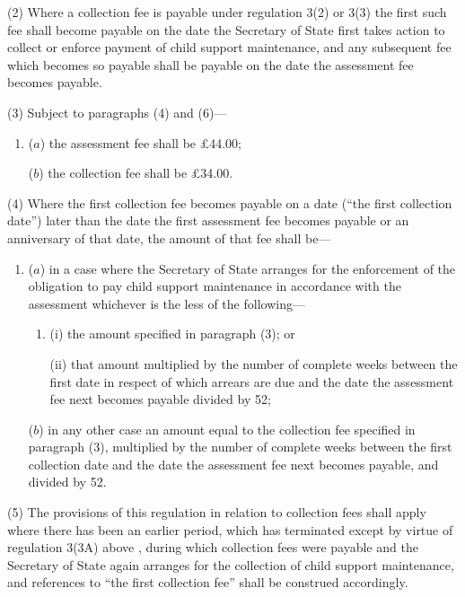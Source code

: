 \documentclass[12pt,a4paper]{article}
\begin{document}
(2) Where a collection fee is payable under regulation 3(2) or 3(3) the first such fee shall become payable on the date the Secretary of State first takes action to collect or enforce payment of child support maintenance, and any subsequent fee which becomes so payable shall be payable on the date the assessment fee becomes payable.

(3) Subject to paragraphs (4) and (6)—
\begin{enumerate}\item[]
($a$) the assessment fee shall be £44.00;

($b$) the collection fee shall be £34.00.
\end{enumerate}

(4) Where the first collection fee becomes payable on a date (“the first collection date”) later than the date the first assessment fee becomes payable or an anniversary of that date, 
the amount of that fee shall be—
\begin{enumerate}\item[]
($a$) in a case where the Secretary of State arranges for the enforcement of the obligation to pay child support maintenance in accordance with the assessment whichever is the less of the following—
\begin{enumerate}\item[]
(i) the amount specified in paragraph (3); or

(ii) that amount multiplied by the number of complete weeks between the first date in respect of which arrears are due and the date the assessment fee next becomes payable divided by 52;
\end{enumerate}

($b$) in any other case an amount equal to the collection fee specified in paragraph (3), multiplied by the number of complete weeks between the first collection date and the date the assessment fee next becomes payable, and divided by 52.
\end{enumerate}  %

(5) The provisions of this regulation in relation to collection fees shall apply where there has been an earlier period, which has terminated
except by virtue of regulation 3(3A) above%
, during which collection fees were payable and the Secretary of State again arranges for the collection of child support maintenance, and references to “the first collection fee” shall be construed accordingly.
\end{document}
